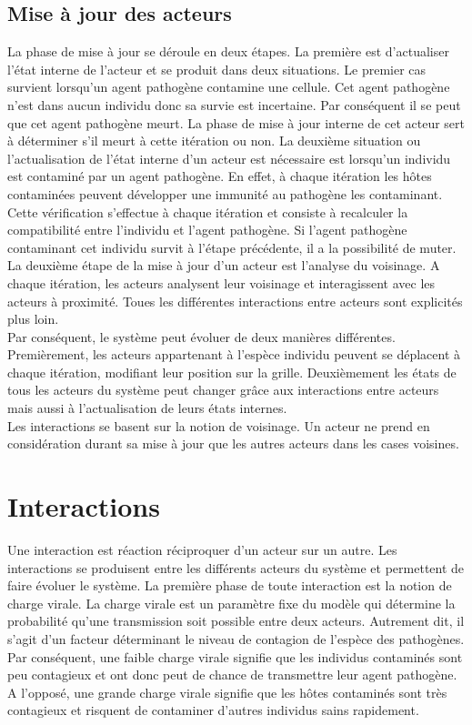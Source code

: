 \subsection{Mise à jour des acteurs}

La phase de mise à jour se déroule en deux étapes. La première est d'actualiser l'état interne de l'acteur et se produit dans deux situations. Le premier cas survient lorsqu'un agent pathogène contamine une cellule. Cet agent pathogène n'est dans aucun individu donc sa survie est incertaine. Par conséquent il se peut que cet agent pathogène meurt. La phase de mise à jour interne de cet acteur sert à déterminer s'il meurt à cette itération ou non. La deuxième situation ou l'actualisation de l'état interne d'un acteur est nécessaire est lorsqu'un individu est contaminé par un agent pathogène. En effet, à chaque itération les hôtes contaminées peuvent développer une immunité au pathogène les contaminant. Cette vérification s'effectue à chaque itération  et consiste à recalculer la compatibilité entre l'individu et l'agent pathogène. Si l'agent pathogène contaminant cet individu survit à l'étape précédente, il a la possibilité de muter. La deuxième étape de la mise à jour d'un acteur est l'analyse du voisinage. A chaque itération, les acteurs analysent leur voisinage et interagissent avec les acteurs à proximité. Toues les différentes interactions entre acteurs sont explicités plus loin.\\

Par conséquent, le système peut évoluer de deux manières différentes. Premièrement, les acteurs appartenant à l'espèce individu peuvent se déplacent à chaque itération, modifiant leur position sur la grille. Deuxièmement les états de tous les acteurs du système peut changer grâce aux interactions entre acteurs mais aussi à l'actualisation de leurs états internes.\\

Les interactions se basent sur la notion de voisinage. Un acteur ne prend en considération durant sa mise à jour que les autres acteurs dans les cases voisines.

\section{Interactions}

Une interaction est réaction réciproquer d'un acteur sur un autre. Les interactions se produisent entre les différents acteurs du système et permettent de faire évoluer le système. La première phase de toute interaction est la notion de charge virale. La charge virale est un paramètre fixe du modèle qui détermine la probabilité qu'une transmission soit possible entre deux acteurs. Autrement dit, il s'agit d'un facteur déterminant le niveau de contagion de l'espèce des pathogènes. Par conséquent, une faible charge virale signifie que les individus contaminés sont peu contagieux et ont donc peut de chance de transmettre leur agent pathogène. A l'opposé, une grande charge virale signifie que les hôtes contaminés sont très contagieux et risquent de contaminer d'autres individus sains rapidement.\\

